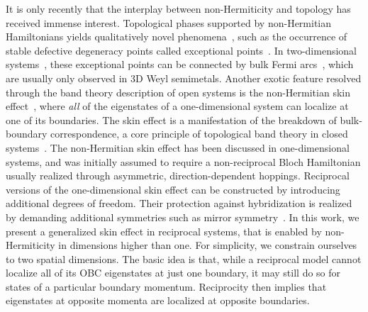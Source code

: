 It is only recently that the interplay between non-Hermiticity and topology has received immense interest. Topological phases supported by non-Hermitian Hamiltonians yields qualitatively novel phenomena~\cite{PhysRevX.8.031079,foatorres19jpm}, such as the occurrence of stable defective degeneracy points called exceptional points~\cite{lee19prl133903,alvarez18prb121401}. In two-dimensional systems~\cite{PhysRevLett.120.146402}, these exceptional points can be connected by bulk Fermi arcs~\cite{Zhou1009}, which are usually only observed in 3D Weyl semimetals. Another exotic feature resolved through the band theory description of open systems is the non-Hermitian skin effect~\cite{Shunyu2018prl}, where \emph{all} of the eigenstates of a one-dimensional system can localize at one of its boundaries. The skin effect is a manifestation of the breakdown of bulk-boundary correspondence, a core principle of topological band theory in closed systems~\cite{XiongBBCbreakdown2018,bbbc,PhysRevB.99.201103,BorgniaCitationRequest}. The non-Hermitian skin effect has been discussed in one-dimensional systems, and was initially assumed to require a non-reciprocal Bloch Hamiltonian usually realized through asymmetric, direction-dependent hoppings. Reciprocal versions of the one-dimensional skin effect can be constructed by introducing additional degrees of freedom. Their protection against hybridization is realized by demanding additional symmetries such as mirror symmetry~\cite{SchnyderPRB2019,okuma2019topological}. In this work, we present a generalized skin effect in reciprocal systems, that is enabled by non-Hermiticity in dimensions higher than one. For simplicity, we constrain ourselves to two spatial dimensions. The basic idea is that, while a reciprocal model cannot localize all of its OBC eigenstates at just one boundary, it may still do so for states of a particular boundary momentum. Reciprocity then implies that eigenstates at opposite momenta are localized at opposite boundaries. 

